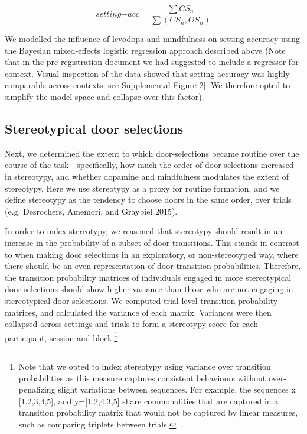 \documentclass{article}
\begin{document}
\[
setting\mathrm{-}acc = \frac{\sum{CS_{n}}}{\sum{(CS_{n}, OS_{n})}}
\]

We modelled the influence of levodopa and mindfulness on
setting-accuracy using the Bayesian mixed-effects logistic regression
approach described above (Note that in the pre-registration document we
had suggested to include a regressor for context. Visual inspection of
the data showed that setting-accuracy was highly comparable across
contexts {[}see Supplemental Figure 2{]}. We therefore opted to simplify
the model space and collapse over this factor).

\hypertarget{stereotypical-door-selections}{%
\subsection{Stereotypical door
selections}\label{stereotypical-door-selections}}

Next, we determined the extent to which door-selections became routine
over the course of the task - specifically, how much the order of door
selections increased in stereotypy, and whether dopamine and mindfulness
modulates the extent of stereotypy. Here we use stereotypy as a proxy
for routine formation, and we define stereotypy as the tendency to
choose doors in the same order, over trials (e.g. Desrochers, Amemori,
and Graybiel 2015).

In order to index stereotypy, we reasoned that stereotypy should result
in an increase in the probability of a subset of door transitions. This
stands in contrast to when making door selections in an exploratory, or
non-stereotyped way, where there should be an even representation of
door transition probabilities. Therefore, the transition probability
matrices of individuals engaged in more stereotypical door selections
should show higher variance than those who are not engaging in
stereotypical door selections. We computed trial level transition
probability matrices, and calculated the variance of each matrix.
Variances were then collapsed across settings and trials to form a
stereotypy score for each participant, session and block.\footnote{Note
  that we opted to index stereotypy using variance over transition
  probabilities as this measure captures consistent behaviours without
  over-penalizing slight variations between sequences. For example, the
  sequences x={[}1,2,3,4,5{]}, and y={[}1,2,4,3,5{]} share commonalities
  that are captured in a transition probability matrix that would not be
  captured by linear measures, such as comparing triplets between
  trials.}
\end{document}
